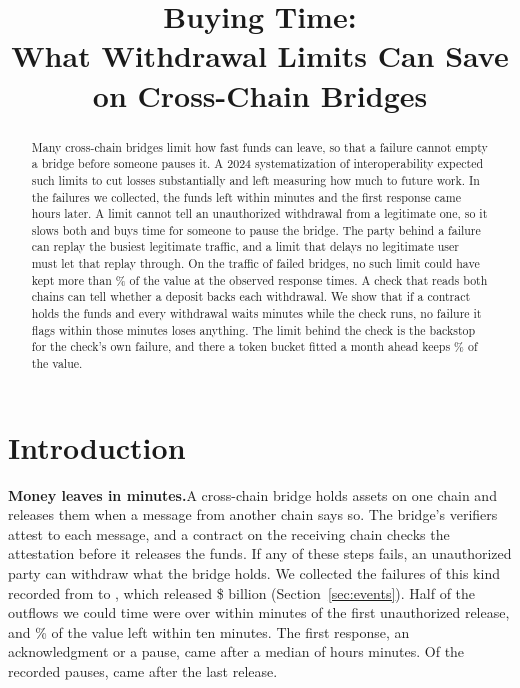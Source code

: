 \documentclass[conference,compsoc]{IEEEtran}
\numberwithin{equation}{section}
\theoremstyle{plain}
\theoremstyle{definition}
\theoremstyle{remark}
\newcommand{\runin}[1]{\par\smallskip\noindent\textbf{#1.}\enspace}
\begin{document}
\title{Buying Time:\\What Withdrawal Limits Can Save on Cross-Chain Bridges}

\author{
}

\maketitle

\begin{abstract}
Many cross-chain bridges limit how fast funds can leave, so that a failure cannot empty a bridge before someone pauses it. A 2024 systematization of interoperability expected such limits to cut losses substantially and left measuring how much to future work. In the \nEvents{} failures we collected, the funds left within minutes and the first response came hours later. A limit cannot tell an unauthorized withdrawal from a legitimate one, so it slows both and buys time for someone to pause the bridge. The party behind a failure can replay the busiest legitimate traffic, and a limit that delays no legitimate user must let that replay through. On the traffic of \pbNWords{} failed bridges, no such limit could have kept more than \pbFloorPctR\% of the value at the observed response times. A check that reads both chains can tell whether a deposit backs each withdrawal. We show that if a contract holds the funds and every withdrawal waits \pbGateMin{} minutes while the check runs, no failure it flags within those minutes loses anything. The limit behind the check is the backstop for the check's own failure, and there a token bucket fitted a month ahead keeps \pbBucketPctR\% of the value.
\end{abstract}

\section{Introduction}\label{sec:intro}

\runin{Money leaves in minutes}A cross-chain bridge holds assets on one chain and releases them when a message from another chain says so. The bridge's verifiers attest to each message, and a contract on the receiving chain checks the attestation before it releases the funds. If any of these steps fails, an unauthorized party can withdraw what the bridge holds. We collected the \nEvents{} failures of this kind recorded from \eventsFirstYear{} to \eventsLastYear{}, which released \$ billion (Section~\ref{sec:events}). Half of the outflows we could time were over within \medOutflowWords{} minutes of the first unauthorized release, and \shareTenMinPct\% of the value left within ten minutes. The first response, an acknowledgment or a pause, came after a median of \medRespH{} hours \medRespM{} minutes. Of the \nPaused{} recorded pauses, \nPausedAfterLast{} came after the last release.
\end{document}
